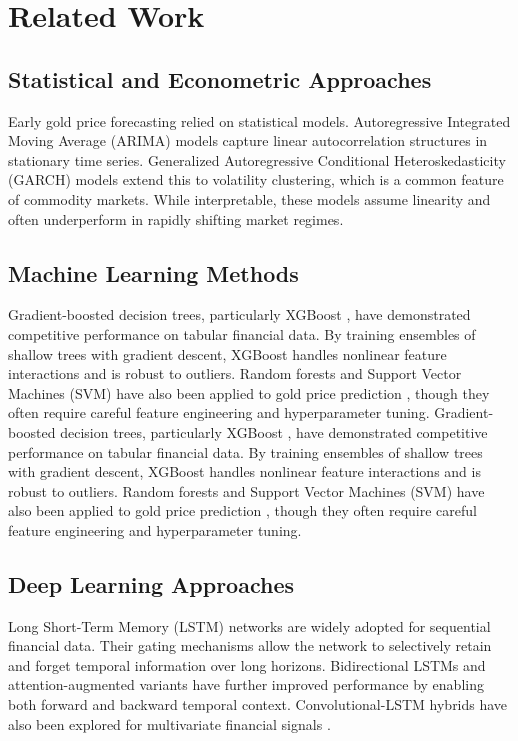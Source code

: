 \documentclass[journal,comsoc]{IEEEtran}
\begin{document}
\section{Related Work}

\subsection{Statistical and Econometric Approaches}
Early gold price forecasting relied on statistical models. Autoregressive Integrated Moving Average (ARIMA) models \cite{faff1999oi} capture linear autocorrelation structures in stationary time series. Generalized Autoregressive Conditional Heteroskedasticity (GARCH) models \cite{box1976analysis} extend this to volatility clustering, which is a common feature of commodity markets. While interpretable, these models assume linearity and often underperform in rapidly shifting market regimes.

\subsection{Machine Learning Methods}
Gradient-boosted decision trees, particularly XGBoost \cite{lecun2015deep}, have demonstrated competitive performance on tabular financial data. By training ensembles of shallow trees with gradient descent, XGBoost handles nonlinear feature interactions and is robust to outliers. Random forests and Support Vector Machines (SVM) have also been applied to gold price prediction \cite{makridakis2018statistical}, though they often require careful feature engineering and hyperparameter tuning.
Gradient-boosted decision trees, particularly XGBoost \cite{jiang2017deep}, have demonstrated competitive performance on tabular financial data. By training ensembles of shallow trees with gradient descent, XGBoost handles nonlinear feature interactions and is robust to outliers. Random forests and Support Vector Machines (SVM) have also been applied to gold price prediction \cite{tay2001application}, though they often require careful feature engineering and hyperparameter tuning.

\subsection{Deep Learning Approaches}
Long Short-Term Memory (LSTM) networks are widely adopted for sequential financial data. Their gating mechanisms allow the network to selectively retain and forget temporal information over long horizons. Bidirectional LSTMs and attention-augmented variants have further improved performance by enabling both forward and backward temporal context. Convolutional-LSTM hybrids have also been explored for multivariate financial signals \cite{yu2019review}.
\end{document}
